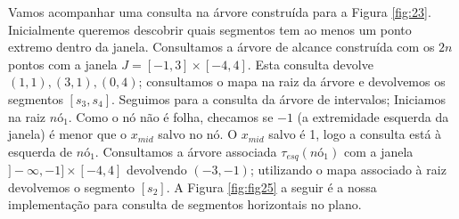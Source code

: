Vamos acompanhar uma consulta na árvore construída para a Figura \ref{fig:23}. Inicialmente queremos descobrir quais segmentos tem ao menos um ponto extremo dentro da janela. Consultamos a árvore de alcance construída com os $2n$ pontos com a janela $J=[-1,3]\times[-4,4]$. Esta consulta devolve $(1,1), (3,1), (0,4)$; consultamos o mapa na raiz da árvore e devolvemos os segmentos $[s_3, s_4]$. Seguimos para a consulta da árvore de intervalos; Iniciamos na raiz $nó_1$. Como o nó não é folha, checamos se $-1$ (a extremidade esquerda da janela) é menor que o $x_{mid}$ salvo no nó. O $x_{mid}$ salvo é 1, logo a consulta está à esquerda de $nó_1$. Consultamos a árvore associada $\tau_{esq}(nó_1)$ com a janela  $]-\infty, -1] \times [-4, 4]$ devolvendo $(-3, -1)$; utilizando o mapa associado à raiz devolvemos o segmento $[s_2]$.
A Figura \ref{fig:fig25} a seguir é a nossa implementação para consulta de segmentos horizontais no plano.

